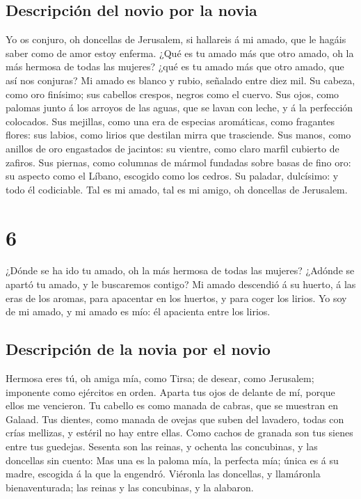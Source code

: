 \hypertarget{descripciuxf3n-del-novio-por-la-novia}{%
\subsection{Descripción del novio por la
novia}\label{descripciuxf3n-del-novio-por-la-novia}}

 Yo os conjuro, oh doncellas de Jerusalem, si hallareis á mi
amado, que le hagáis saber como de amor estoy enferma.  ¿Qué
es tu amado más que otro amado, oh la más hermosa de todas las mujeres?
¿qué es tu amado más que otro amado, que así nos conjuras? 
Mi amado es blanco y rubio, señalado entre diez mil.  Su
cabeza, como oro finísimo; sus cabellos crespos, negros como el cuervo.
 Sus ojos, como palomas junto á los arroyos de las aguas,
que se lavan con leche, y á la perfección colocados.  Sus
mejillas, como una era de especias aromáticas, como fragantes flores:
sus labios, como lirios que destilan mirra que trasciende. 
Sus manos, como anillos de oro engastados de jacintos: su vientre, como
claro marfil cubierto de zafiros.  Sus piernas, como
columnas de mármol fundadas sobre basas de fino oro: su aspecto como el
Líbano, escogido como los cedros.  Su paladar, dulcísimo: y
todo él codiciable. Tal es mi amado, tal es mi amigo, oh doncellas de
Jerusalem.

\hypertarget{section-5}{%
\section{6}\label{section-5}}

 ¿Dónde se ha ido tu amado, oh la más hermosa de todas las
mujeres? ¿Adónde se apartó tu amado, y le buscaremos contigo?
 Mi amado descendió á su huerto, á las eras de los aromas,
para apacentar en los huertos, y para coger los lirios.  Yo
soy de mi amado, y mi amado es mío: él apacienta entre los lirios.

\hypertarget{descripciuxf3n-de-la-novia-por-el-novio-1}{%
\subsection{Descripción de la novia por el
novio}\label{descripciuxf3n-de-la-novia-por-el-novio-1}}

 Hermosa eres tú, oh amiga mía, como Tirsa; de desear, como
Jerusalem; imponente como ejércitos en orden.  Aparta tus
ojos de delante de mí, porque ellos me vencieron. Tu cabello es como
manada de cabras, que se muestran en Galaad.  Tus dientes,
como manada de ovejas que suben del lavadero, todas con crías mellizas,
y estéril no hay entre ellas.  Como cachos de granada son
tus sienes entre tus guedejas.  Sesenta son las reinas, y
ochenta las concubinas, y las doncellas sin cuento:  Mas una
es la paloma mía, la perfecta mía; única es á su madre, escogida á la
que la engendró. Viéronla las doncellas, y llamáronla bienaventurada;
las reinas y las concubinas, y la alabaron.

